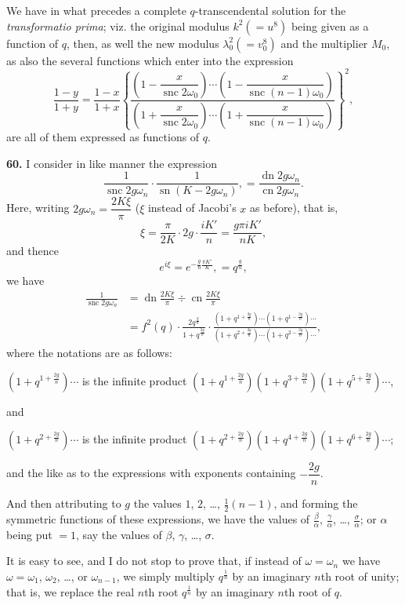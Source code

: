 \documentclass[12pt,a4paper]{article}
\DeclareMathOperator{\sn}{sn}
\DeclareMathOperator{\cn}{cn}
\DeclareMathOperator{\dn}{dn}
\DeclareMathOperator{\snc}{snc}
\begin{document}
We have in what precedes a complete $q$-transcendental solution for the \textit{transformatio prima}; viz. the original modulus $k^2 (= u^8)$ being given as a function of $q$, then, as well the new modulus $\lambda_0^2 (= v_0^8)$ and the multiplier $M_0$, as also the several functions which enter into the expression
\[
\frac{1 - y}{1 + y} = \frac{1 - x}{1 + x}
\left\{
\frac{\left(1 - \dfrac{x}{\snc 2\omega_0}\right) \cdots
\left(1 - \dfrac{x}{\snc (n-1)\omega_0}\right)}
{\left(1 + \dfrac{x}{\snc 2\omega_0}\right) \cdots
\left(1 + \dfrac{x}{\snc (n-1)\omega_0}\right)}
\right\}^2,
\]
are all of them expressed as functions of $q$.

\textbf{60.} I consider in like manner the expression
\[
\frac{1}{\snc 2g\omega_n} \cdot \frac{1}{\sn(K - 2g\omega_n)},
= \frac{\dn 2g\omega_n}{\cn 2g\omega_n}.
\]
Here, writing $2g\omega_n = \dfrac{2K\xi}{\pi}$ ($\xi$ instead of Jacobi's $x$ as before), that is,
\[
\xi = \frac{\pi}{2K} \cdot 2g \cdot \frac{iK'}{n} = \frac{g\pi iK'}{nK},
\]
and thence
\[
e^{i\xi} = e^{-\frac{g}{n}\frac{\pi K'}{K}}, = q^{\frac{g}{n}},
\]
we have
\begin{align*}
\frac{1}{\snc 2g\omega_n}
&= \dn \frac{2K\xi}{\pi} \div \cn \frac{2K\xi}{\pi} \\
&= f^2(q) \cdot \frac{2q^{\frac{g}{n}}}{1 + q^{\frac{2g}{n}}} \cdot
\frac{(1 + q^{1 + \frac{2g}{n}}) \cdots (1 + q^{1 - \frac{2g}{n}}) \cdots}
{(1 + q^{2 + \frac{2g}{n}}) \cdots (1 + q^{2 - \frac{2g}{n}}) \cdots},
\end{align*}
where the notations are as follows:

$(1 + q^{1 + \frac{2g}{n}}) \cdots$ is the infinite product $(1 + q^{1 + \frac{2g}{n}})(1 + q^{3 + \frac{2g}{n}})(1 + q^{5 + \frac{2g}{n}}) \cdots$,

and

$(1 + q^{2 + \frac{2g}{n}}) \cdots$ is the infinite product $(1 + q^{2 + \frac{2g}{n}})(1 + q^{4 + \frac{2g}{n}})(1 + q^{6 + \frac{2g}{n}}) \cdots$;

and the like as to the expressions with exponents containing $-\dfrac{2g}{n}$.

And then attributing to $g$ the values $1$, $2$, \ldots, $\frac{1}{2}(n-1)$, and forming the symmetric functions of these expressions, we have the values of $\frac{\beta}{\alpha}$, $\frac{\gamma}{\alpha}$, \ldots, $\frac{\sigma}{\alpha}$; or $\alpha$ being put $= 1$, say the values of $\beta$, $\gamma$, \ldots, $\sigma$.

It is easy to see, and I do not stop to prove that, if instead of $\omega = \omega_n$ we have $\omega = \omega_1$, $\omega_2$, \ldots, or $\omega_{n-1}$, we simply multiply $q^{\frac{1}{n}}$ by an imaginary $n$th root of unity; that is, we replace the real $n$th root $q^{\frac{1}{n}}$ by an imaginary $n$th root of $q$.
\end{document}
